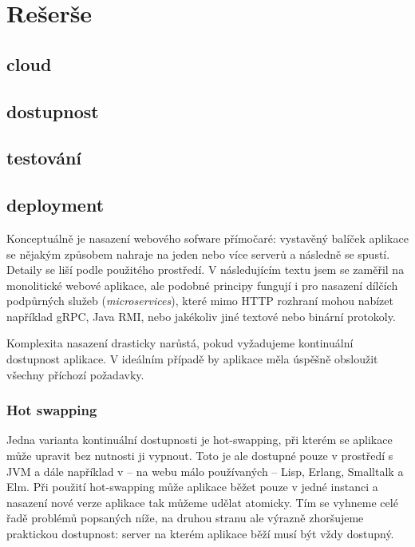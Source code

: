 \chapter{Rešerše}
    \blind[4]

    \section{cloud}
        \blind[2]

    \section{dostupnost}
        \blind[3]

    \section{testování}
        \blind[4]

    \section{deployment}
        \blind[1]

        Konceptuálně je nasazení webového sofware přímočaré: vystavěný balíček aplikace se nějakým způsobem nahraje na jeden nebo více serverů a následně se spustí. Detaily se liší podle použitého prostředí. V následujícím textu jsem se zaměřil na monolitické webové aplikace, ale podobné principy fungují i pro nasazení dílčích podpůrných služeb (\textit{microservices}), které mimo HTTP rozhraní mohou nabízet například gRPC, Java RMI, nebo jakékoliv jiné textové nebo binární protokoly.

        Komplexita nasazení drasticky narůstá, pokud vyžadujeme kontinuální dostupnost aplikace. V ideálním případě by aplikace měla úspěšně obsloužit všechny příchozí požadavky.

        \subsection{Hot swapping}
            Jedna varianta kontinuální dostupnosti je hot-swapping, při kterém se aplikace může upravit bez nutnosti ji vypnout. Toto je ale dostupné pouze v prostředí s JVM a dále například v -- na webu málo používaných -- Lisp, Erlang, Smalltalk a Elm. Při použití hot-swapping může aplikace běžet pouze v jedné instanci a nasazení nové verze aplikace tak můžeme udělat atomicky. Tím se vyhneme celé řadě problémů popsaných níže, na druhou stranu ale výrazně zhoršujeme praktickou dostupnost: server na kterém aplikace běží musí být vždy dostupný.

